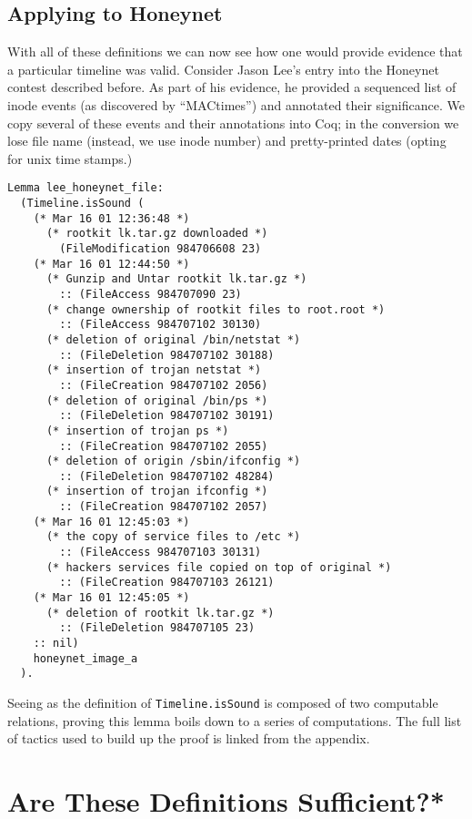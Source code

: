 \documentclass[nocopyrightspace]{sigplanconf}
\begin{document}
\subsection{Applying to Honeynet}
With all of these definitions we can now see how one would provide evidence
that a particular timeline was valid. Consider Jason Lee's entry\cite{lee}
into the Honeynet contest described before. As part of his evidence, he
provided a sequenced list of inode events (as discovered by ``MACtimes'') and
annotated their significance. We copy several of these events and their
annotations into Coq; in the conversion we lose file name (instead, we use
inode number) and pretty-printed dates (opting for unix time stamps.)

\begin{lstlisting}
Lemma lee_honeynet_file:
  (Timeline.isSound (
    (* Mar 16 01 12:36:48 *)
      (* rootkit lk.tar.gz downloaded *)
        (FileModification 984706608 23)
    (* Mar 16 01 12:44:50 *)
      (* Gunzip and Untar rootkit lk.tar.gz *)
        :: (FileAccess 984707090 23)
      (* change ownership of rootkit files to root.root *)
        :: (FileAccess 984707102 30130)
      (* deletion of original /bin/netstat *)
        :: (FileDeletion 984707102 30188)
      (* insertion of trojan netstat *)
        :: (FileCreation 984707102 2056) 
      (* deletion of original /bin/ps *)
        :: (FileDeletion 984707102 30191)
      (* insertion of trojan ps *)
        :: (FileCreation 984707102 2055) 
      (* deletion of origin /sbin/ifconfig *)
        :: (FileDeletion 984707102 48284)
      (* insertion of trojan ifconfig *)
        :: (FileCreation 984707102 2057) 
    (* Mar 16 01 12:45:03 *)
      (* the copy of service files to /etc *)
        :: (FileAccess 984707103 30131)  
      (* hackers services file copied on top of original *)
        :: (FileCreation 984707103 26121)
    (* Mar 16 01 12:45:05 *)
      (* deletion of rootkit lk.tar.gz *)
        :: (FileDeletion 984707105 23)   
    :: nil)
    honeynet_image_a
  ).
\end{lstlisting}

Seeing as the definition of {\tt Timeline.isSound} is composed of two
computable relations, proving this lemma boils down to a series of
computations. The full list of tactics used to build up the proof is linked
from the appendix.

\section{Are These Definitions Sufficient?*}
\label{sec:sufficient}
\end{document}
